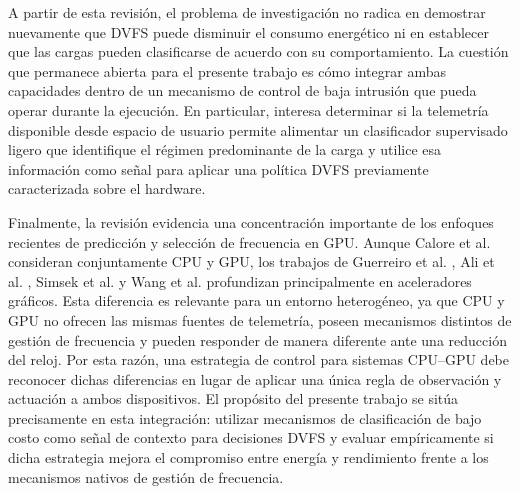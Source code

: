 A partir de esta revisión, el problema de investigación no radica en demostrar nuevamente que DVFS puede disminuir el consumo energético ni en establecer que las cargas pueden clasificarse de acuerdo con su comportamiento. La cuestión que permanece abierta para el presente trabajo es cómo integrar ambas capacidades dentro de un mecanismo de control de baja intrusión que pueda operar durante la ejecución. En particular, interesa determinar si la telemetría disponible desde espacio de usuario permite alimentar un clasificador supervisado ligero que identifique el régimen predominante de la carga y utilice esa información como señal para aplicar una política DVFS previamente caracterizada sobre el hardware.

Finalmente, la revisión evidencia una concentración importante de los enfoques recientes de predicción y selección de frecuencia en GPU. Aunque Calore et al. \cite{Calore2017} consideran conjuntamente CPU y GPU, los trabajos de Guerreiro et al. \cite{Guerreiro2019}, Ali et al. \cite{Ali2023}, Simsek et al. \cite{Simsek2024} y Wang et al. \cite{Wang2024} profundizan principalmente en aceleradores gráficos. Esta diferencia es relevante para un entorno heterogéneo, ya que CPU y GPU no ofrecen las mismas fuentes de telemetría, poseen mecanismos distintos de gestión de frecuencia y pueden responder de manera diferente ante una reducción del reloj. Por esta razón, una estrategia de control para sistemas CPU--GPU debe reconocer dichas diferencias en lugar de aplicar una única regla de observación y actuación a ambos dispositivos. El propósito del presente trabajo se sitúa precisamente en esta integración: utilizar mecanismos de clasificación de bajo costo como señal de contexto para decisiones DVFS y evaluar empíricamente si dicha estrategia mejora el compromiso entre energía y rendimiento frente a los mecanismos nativos de gestión de frecuencia.
